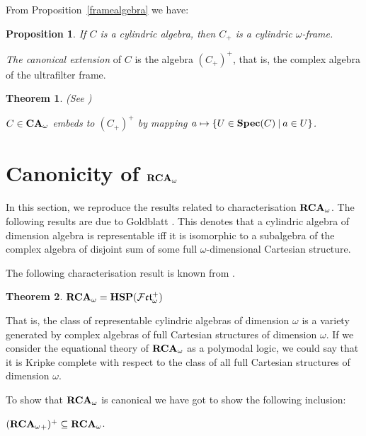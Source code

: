\documentclass{article}
\theoremstyle{defin}
\theoremstyle{theorem}
\newtheorem{theorem}{Theorem}
\theoremstyle{claim}
\theoremstyle{prop}
\newtheorem{prop}{Proposition}
\theoremstyle{lemma}
\theoremstyle{fact}
\theoremstyle{remark}
\theoremstyle{ex}
\theoremstyle{col}
\theoremstyle{question}
\begin{document}
From Proposition~\ref{framealgebra} we have:
\begin{prop}
If $C$ is a cylindric algebra, then $C_+$ is a cylindric $\omega$-frame.
\end{prop}

\emph{The canonical extension} of $C$ is the algebra $(C_+)^+$, that is, the complex algebra of the ultrafilter frame.

\begin{theorem} (See \cite{jonsson1951boolean})

$C \in {\bf CA}_{\omega}$ embeds to $(C_+)^+$ by mapping $a \mapsto \{ U \in {\bf Spec}(C) \: | \: a \in U \}$.
\end{theorem}

\section{Canonicity of ${\bf RCA}_{\omega}$}

In this section, we reproduce the results related to characterisation ${\bf RCA}_{\omega}$. The following results are due to Goldblatt \cite{goldblatt1995elementary}. This denotes that a cylindric algebra of dimension algebra is representable iff it is isomorphic to a subalgebra of the complex algebra of disjoint sum of some full $\omega$-dimensional Cartesian structure.

\vspace{\baselineskip}

The following characterisation result is known from \cite[Theorem 2.2.3]{Venema2013}.

\begin{theorem}
${\bf RCA}_{\omega} = {\bf HSP}(\mathcal{F}\mathfrak{ct}_{\omega}^{+})$
\end{theorem}

That is, the class of representable cylindric algebras of dimension $\omega$ is a variety generated by complex algebras of full Cartesian structures of dimension $\omega$. If we consider the equational theory of ${\bf RCA}_{\omega}$ as a polymodal logic, we could say that it is Kripke complete with respect to the class of all full Cartesian structures of dimension $\omega$.

To show that ${\bf RCA}_{\omega}$ is canonical we have got to show the following inclusion:

\begin{center}
$({{\bf RCA}_{\omega}}_{+})^+ \subseteq {\bf RCA}_{\omega}$.
\end{center}
\end{document}
